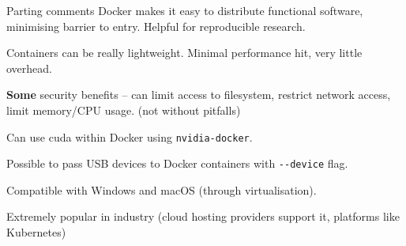 \documentclass[10pt]{beamer}
\begin{document}
\begin{frame}[fragile]{Parting comments}
\vfill Docker makes it easy to distribute functional software, minimising barrier to entry. Helpful for reproducible research.

\vfill Containers can be really lightweight. Minimal performance hit, very little overhead. 

\vfill \textbf{Some} security benefits -- can limit access to filesystem, restrict network access, limit memory/CPU usage. (not without pitfalls) 

\vfill Can use cuda within Docker using \verb|nvidia-docker|.

\vfill Possible to pass USB devices to Docker containers with \verb|--device| flag.

\vfill Compatible with Windows and macOS (through virtualisation).

\vfill Extremely popular in industry (cloud hosting providers support it, platforms like Kubernetes)

\end{frame}
\end{document}
